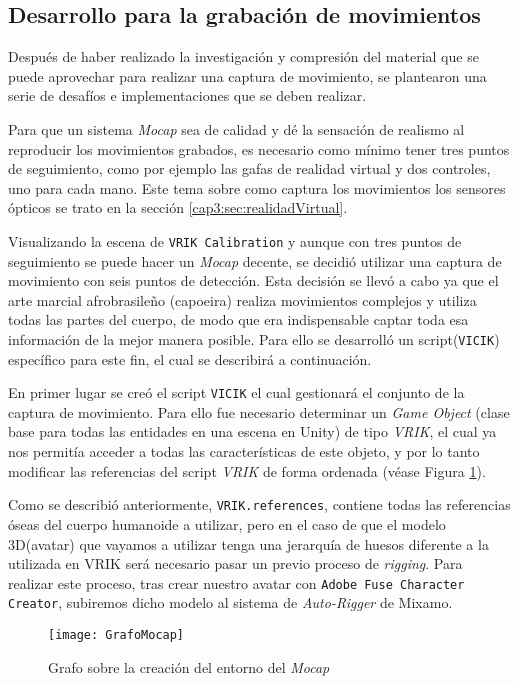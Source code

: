 \subsection{Desarrollo para la grabación de movimientos}

Después de haber realizado la investigación y compresión del material que se puede aprovechar para realizar una captura de movimiento, se plantearon una serie de desafíos e implementaciones que se deben realizar.

Para que un sistema \textit{Mocap} sea de calidad y dé la sensación de realismo al reproducir los movimientos grabados, es necesario como mínimo tener tres puntos de seguimiento, como por ejemplo las gafas de realidad virtual y dos controles, uno para cada mano. Este tema sobre como captura los movimientos los sensores ópticos se trato en la sección \ref{cap3:sec:realidadVirtual}.

Visualizando la escena de \texttt{VRIK Calibration} y aunque con tres puntos de seguimiento se puede hacer un \textit{Mocap} decente, se decidió utilizar una captura de movimiento con seis puntos de detección. Esta decisión se llevó a cabo ya que el arte marcial afrobrasileño (capoeira) realiza movimientos complejos y utiliza todas las partes del cuerpo, de modo que era indispensable captar toda esa información de la mejor manera posible. 
Para ello se desarrolló un script(\texttt{VICIK}) específico para este fin, el cual se describirá a continuación.

En primer lugar se creó el script \texttt{VICIK} el cual gestionará el conjunto de la captura de movimiento. Para ello fue necesario determinar un \textit{Game Object} (clase base para todas las entidades en una escena en Unity) de tipo \textit{VRIK}, el cual ya nos permitía acceder a todas las características de este objeto, y por lo tanto modificar las referencias del script \textit{VRIK} de forma ordenada (véase Figura \ref{fig:GrafoMocap}). 

Como se describió anteriormente, \texttt{VRIK.references}, contiene todas las referencias óseas del cuerpo humanoide a utilizar, pero en el caso de que el modelo 3D(avatar) que vayamos a utilizar tenga una jerarquía de huesos diferente a la utilizada en VRIK será necesario pasar un previo proceso de \textit{rigging}. Para realizar este proceso, tras crear nuestro avatar con \texttt{Adobe Fuse Character Creator}, subiremos dicho modelo al sistema de \textit{Auto-Rigger} de Mixamo.

\begin{figure}[h!]
    \centering 
    \texttt{[image: GrafoMocap]}
    \caption{Grafo sobre la creación del entorno del \textit{Mocap}}
    \label{fig:GrafoMocap}
\end{figure} 

